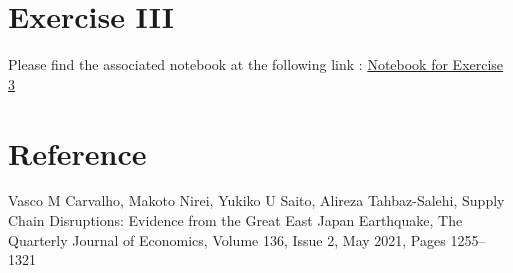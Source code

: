 \documentclass{article}
\begin{document}
\section{Exercise III}
Please find the associated notebook at the following link :  \href{https://pluto.land/n/mn6s26jq}{Notebook for Exercise 3} 

\section{Reference}
Vasco M Carvalho, Makoto Nirei, Yukiko U Saito, Alireza Tahbaz-Salehi, Supply Chain Disruptions: Evidence from the Great East Japan Earthquake, The Quarterly Journal of Economics, Volume 136, Issue 2, May 2021, Pages 1255–1321
\end{document}
